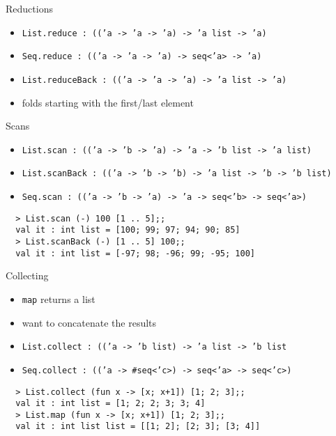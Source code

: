 \documentclass{beamer}
\begin{document}
\begin{frame}{Reductions}
  \small
  \begin{itemize}
    \item \texttt{List.reduce : (('a -> 'a -> 'a) -> 'a list -> 'a)}
    \item \texttt{Seq.reduce : (('a -> 'a -> 'a) -> seq<'a> -> 'a)}
    \item \texttt{List.reduceBack : (('a -> 'a -> 'a) -> 'a list -> 'a)}
  \end{itemize}
  \begin{itemize}
    \item folds starting with the first/last element
  \end{itemize}
\end{frame}

\begin{frame}[fragile]{Scans}
  \tiny
  \begin{itemize}
    \item \texttt{List.scan : (('a -> 'b -> 'a) -> 'a -> 'b list -> 'a list)}
    \item \texttt{List.scanBack : (('a -> 'b -> 'b) -> 'a list -> 'b -> 'b list)}
    \item \texttt{Seq.scan : (('a -> 'b -> 'a) -> 'a -> seq<'b> -> seq<'a>)}
  \end{itemize}
  \begin{verbatim}
  > List.scan (-) 100 [1 .. 5];;
  val it : int list = [100; 99; 97; 94; 90; 85]
  > List.scanBack (-) [1 .. 5] 100;;
  val it : int list = [-97; 98; -96; 99; -95; 100]
  \end{verbatim}
\end{frame}

\begin{frame}[fragile]{Collecting}
  \begin{itemize}
    \item \texttt{map} returns a list
    \item want to concatenate the results
    \pause
    \tiny
    \item \texttt{List.collect : (('a -> 'b list) -> 'a list -> 'b list}
    \item \texttt{Seq.collect : (('a -> \#seq<'c>) -> seq<'a> -> seq<'c>)}
  \end{itemize}
  \begin{verbatim}
  > List.collect (fun x -> [x; x+1]) [1; 2; 3];;
  val it : int list = [1; 2; 2; 3; 3; 4]
  > List.map (fun x -> [x; x+1]) [1; 2; 3];;
  val it : int list list = [[1; 2]; [2; 3]; [3; 4]]
  \end{verbatim}
\end{frame}
\end{document}
